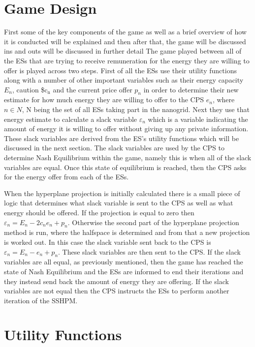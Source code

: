 \documentclass[a4paper, notitlepage]{report}
\begin{document}
\section{Game Design}
\label{sec:org13729a9}
First some of the key components of the game as well as a brief overview of how
it  is conducted will be explained and then after that, the game will be
discussed ins and outs will be discussed in further detail The game played
between all of the ESs that are trying to receive remuneration for the energy
they are willing to offer is played across two steps. First of all the ESs use
their utility functions along with a number of other important variables such as
their energy capacity \(E_n\), caution \$c\(_{\text{n}}\) and the current price offer \(p_n\) in
order to determine their new estimate for how much energy they are willing to
offer to the CPS \(e_n\), where \(n \in N\), N being the set of all ESs taking part in
the nanogrid. Next they use that energy estimate to calculate a slack variable
\(\varepsilon_n\) which is a variable indicating the amount of energy it is willing to offer
without giving up any private information. These slack variables are derived
from the ES's utility functions which will be discussed in the next section. The
slack variables are used by the CPS to determine Nash Equilibrium within the
game, namely this is when all of the slack variables are equal. Once this state
of equilibrium is reached, then the CPS asks for the energy offer from each of the
ESs.

When the hyperplane projection is initially calculated there is a small piece of
logic that determines what slack variable is sent to the CPS as well as what
energy should be offered. If the projection is equal to zero then \(\varepsilon_n = E_n -
2c_{n}e_{n} + p_n\). Otherwise the second part of the hyperplane projection method is
run, where the halfspace is determined and from that a new projection is worked
out. In this case the slack variable sent back to the CPS is \(\varepsilon_n = E_n - e_n +
p_n\). These slack variables are then sent to the CPS. If the slack variables are
all equal, as previously mentioned, then the game has reached the state of Nash
Equilibrium and the ESs are informed to end their iterations and they instead
send back the amount of energy they are offering. If the slack variables are not
equal then the CPS instructs the ESs to perform another iteration of the SSHPM.
\section{Utility Functions}
\label{sec:orgedefdf4}
\end{document}
